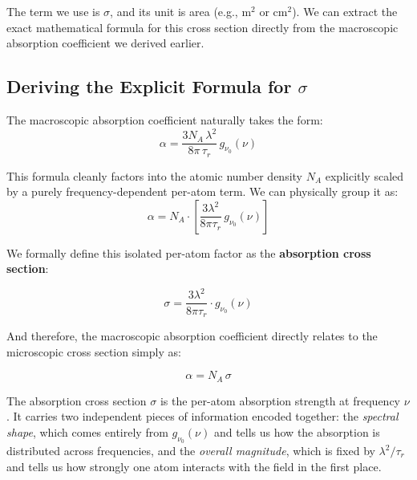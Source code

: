 The term we use is $\sigma$, and its unit is area (e.g., $\text{m}^2$ or $\text{cm}^2$). We can extract the exact mathematical formula for this cross section directly from the macroscopic absorption coefficient we derived earlier.

\subsection{Deriving the Explicit Formula for \texorpdfstring{$\sigma$}{sigma(nu)}}

The macroscopic absorption coefficient naturally takes the form:
\begin{equation*}
    \alpha = \frac{3N_A\,\lambda^2}{8\pi\,\tau_r}\,g_{\nu_0}(\nu)
\end{equation*}

This formula cleanly factors into the atomic number density $N_A$ explicitly scaled by a purely frequency-dependent per-atom term. We can physically group it as:
\begin{equation*}
    \alpha = N_A \cdot \left[ \frac{3\lambda^2}{8\pi\tau_r}\,g_{\nu_0}(\nu) \right]
\end{equation*}

We formally define this isolated per-atom factor as the \textbf{absorption cross section}:

\begin{keyresult}
    \begin{equation}
        \sigma = \frac{3\lambda^2}{8\pi\tau_r}\cdot g_{\nu_0}(\nu)
    \end{equation}
\end{keyresult}

And therefore, the macroscopic absorption coefficient directly relates to the microscopic cross section simply as:
\begin{keyresult}
    \begin{equation}
        \alpha = N_A\,\sigma
    \end{equation}
\end{keyresult}

The absorption cross section $\sigma$ is the per-atom absorption strength at frequency $\nu$. It carries two independent pieces of information encoded together: the \emph{spectral shape}, which comes entirely from $g_{\nu_0}(\nu)$ and tells us how the absorption is distributed across frequencies, and the \emph{overall magnitude}, which is fixed by $\lambda^2/\tau_r$ and tells us how strongly one atom interacts with the field in the first place.

